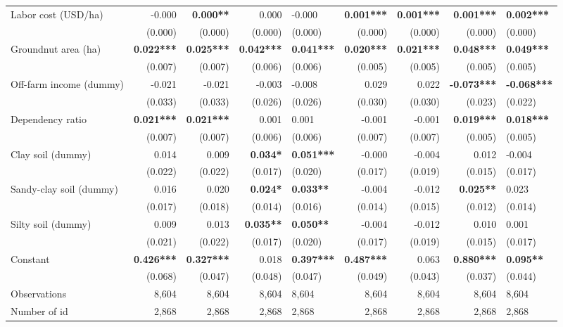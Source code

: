 \documentclass[
]{article}
\begin{document}
\begin{landscape}
\begin{longtable}[t]{lrrrlrrrl}
Labor cost (USD/ha) & -0.000 & \textbf{0.000**} & 0.000 & -0.000 & \textbf{0.001***} & \textbf{0.001***} & \textbf{0.001***} & \textbf{0.002***}\\
 & (0.000) & (0.000) & (0.000) & (0.000) & (0.000) & (0.000) & (0.000) & (0.000)\\
Groundnut area (ha) & \textbf{0.022***} & \textbf{0.025***} & \textbf{0.042***} & \textbf{0.041***} & \textbf{0.020***} & \textbf{0.021***} & \textbf{0.048***} & \textbf{0.049***}\\
 & (0.007) & (0.007) & (0.006) & (0.006) & (0.005) & (0.005) & (0.005) & (0.005)\\
\addlinespace
Off-farm income (dummy) & -0.021 & -0.021 & -0.003 & -0.008 & 0.029 & 0.022 & \textbf{-0.073***} & \textbf{-0.068***}\\
 & (0.033) & (0.033) & (0.026) & (0.026) & (0.030) & (0.030) & (0.023) & (0.022)\\
Dependency ratio & \textbf{0.021***} & \textbf{0.021***} & 0.001 & 0.001 & -0.001 & -0.001 & \textbf{0.019***} & \textbf{0.018***}\\
 & (0.007) & (0.007) & (0.006) & (0.006) & (0.007) & (0.007) & (0.005) & (0.005)\\
Clay soil (dummy) & 0.014 & 0.009 & \textbf{0.034*} & \textbf{0.051***} & -0.000 & -0.004 & 0.012 & -0.004\\
\addlinespace
 & (0.022) & (0.022) & (0.017) & (0.020) & (0.017) & (0.019) & (0.015) & (0.017)\\
Sandy-clay soil (dummy) & 0.016 & 0.020 & \textbf{0.024*} & \textbf{0.033**} & -0.004 & -0.012 & \textbf{0.025**} & 0.023\\
 & (0.017) & (0.018) & (0.014) & (0.016) & (0.014) & (0.015) & (0.012) & (0.014)\\
Silty soil (dummy) & 0.009 & 0.013 & \textbf{0.035**} & \textbf{0.050**} & -0.004 & -0.012 & 0.010 & 0.001\\
 & (0.021) & (0.022) & (0.017) & (0.020) & (0.017) & (0.019) & (0.015) & (0.017)\\
\addlinespace
Constant & \textbf{0.426***} & \textbf{0.327***} & 0.018 & \textbf{0.397***} & \textbf{0.487***} & 0.063 & \textbf{0.880***} & \textbf{0.095**}\\
 & (0.068) & (0.047) & (0.048) & (0.047) & (0.049) & (0.043) & (0.037) & (0.044)\\
\midrule
Observations & 8,604 & 8,604 & 8,604 & 8,604 & 8,604 & 8,604 & 8,604 & 8,604\\
Number of id & 2,868 & 2,868 & 2,868 & 2,868 & 2,868 & 2,868 & 2,868 & 2,868\\

\end{longtable}
\end{landscape}
\end{document}
